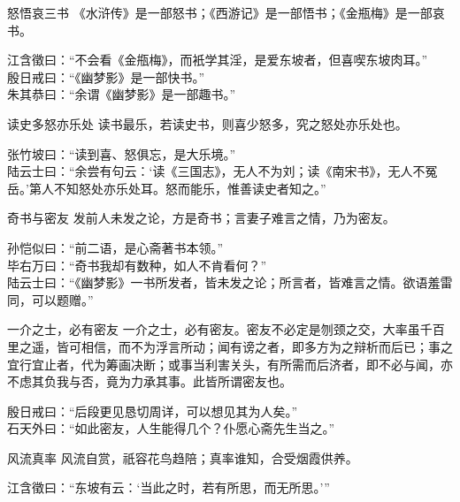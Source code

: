 \begin{yulu}{怒悟哀三书}
《水浒传》是一部怒书；《西游记》是一部悟书；《金瓶梅》是一部哀书。
\begin{comments}
江含徵曰：“不会看《金甁梅》，而衹学其淫，是爱东坡者，但喜喫东坡肉耳。” \\
殷日戒曰：“《幽梦影》是一部快书。” \\
朱其恭曰：“余谓《幽梦影》是一部趣书。”
\end{comments}
\end{yulu}

\begin{yulu}{读史多怒亦乐处}
读书最乐，若读史书，则喜少怒多，究之怒处亦乐处也。
\begin{comments}
张竹坡曰：“读到喜、怒俱忘，是大乐境。” \\
陆云士曰：“余尝有句云：‘读《三国志》，无人不为刘；读《南宋书》，无人不冤岳。’第人不知怒处亦乐处耳。怒而能乐，惟善读史者知之。”
\end{comments}
\end{yulu}

\begin{yulu}{奇书与密友}
发前人未发之论，方是奇书；言妻子难言之情，乃为密友。
\begin{comments}
孙恺似曰：“前二语，是心斋著书本领。” \\
毕右万曰：“奇书我却有数种，如人不肯看何？” \\
陆云士曰：“《幽梦影》一书所发者，皆未发之论；所言者，皆难言之情。欲语羞雷同，可以题赠。”
\end{comments}
\end{yulu}

\begin{yulu}{一介之士，必有密友}
一介之士，必有密友。密友不必定是刎颈之交，大率虽千百里之遥，皆可相信，而不为浮言所动；闻有谤之者，即多方为之辩析而后已；事之宜行宜止者，代为筹画决断；或事当利害关头，有所需而后济者，即不必与闻，亦不虑其负我与否，竟为力承其事。此皆所谓密友也。
\begin{comments}
殷日戒曰：“后段更见恳切周详，可以想见其为人矣。” \\
石天外曰：“如此密友，人生能得几个？仆愿心斋先生当之。”
\end{comments}
\end{yulu}

\begin{yulu}{风流真率}
风流自赏，祇容花鸟趋陪；真率谁知，合受烟霞供养。
\begin{comments}
江含徵曰：“东坡有云：‘当此之时，若有所思，而无所思。’”
\end{comments}
\end{yulu}

